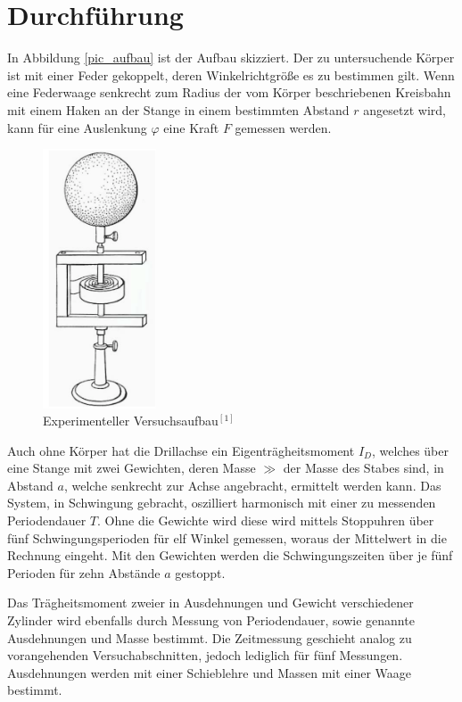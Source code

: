 \section{Durchführung}
In Abbildung \eqref{pic_aufbau} ist der Aufbau skizziert. Der zu untersuchende Körper ist mit einer Feder gekoppelt, deren Winkelrichtgröße
es zu bestimmen gilt. Wenn eine Federwaage senkrecht zum Radius der vom Körper beschriebenen Kreisbahn mit einem Haken an der Stange
in einem bestimmten Abstand $r$ angesetzt wird, kann für eine Auslenkung $\varphi$ eine Kraft $F$ gemessen werden. 
\begin{figure}[H]
 \includegraphics[width=0.3\textwidth]{pics/aufbau.png}
 \caption{Experimenteller Versuchsaufbau$^{[1]}$}
 \label{pic_aufbau}
\end{figure}

Auch ohne Körper hat die Drillachse ein Eigenträgheitsmoment $I_D$, welches über eine Stange mit zwei Gewichten, deren Masse $\gg$ der Masse des Stabes sind, in Abstand $a$, welche senkrecht zur Achse angebracht, ermittelt werden kann. Das System, in Schwingung gebracht, oszilliert harmonisch mit einer zu messenden Periodendauer $T$. Ohne die Gewichte wird diese wird mittels Stoppuhren über fünf Schwingungsperioden für elf Winkel 
gemessen, woraus der  Mittelwert in die Rechnung eingeht. Mit den Gewichten werden die Schwingungszeiten über je fünf Perioden für 
zehn Abstände $a$ gestoppt. 

Das Trägheitsmoment zweier in Ausdehnungen und Gewicht verschiedener Zylinder wird ebenfalls durch Messung von Periodendauer, sowie 
genannte Ausdehnungen und Masse bestimmt. Die Zeitmessung geschieht analog zu vorangehenden Versuchabschnitten, jedoch lediglich für
fünf Messungen. Ausdehnungen werden mit einer Schieblehre und Massen mit einer Waage bestimmt.

